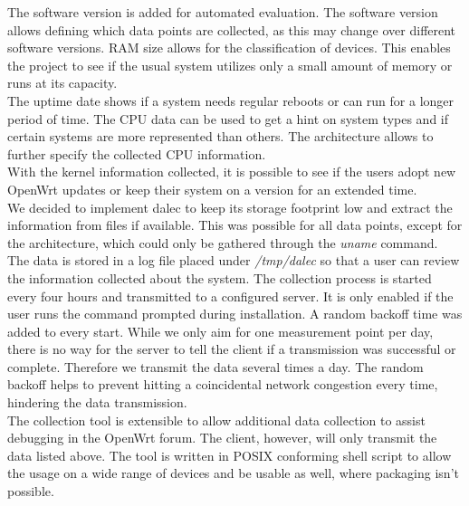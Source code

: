     The software version is added for automated evaluation. The software version allows defining which data points are collected, as this may change over different software versions. RAM size allows for the classification of devices. This enables the project to see if the usual system utilizes only a small amount of memory or runs at its capacity.\\
    The uptime date shows if a system needs regular reboots or can run for a longer period of time. The CPU data can be used to get a hint on system types and if certain systems are more represented than others. The architecture allows to further specify the collected CPU information.\\
    With the kernel information collected, it is possible to see if the users adopt new OpenWrt updates or keep their system on a version for an extended time.\\
    
    We decided to implement dalec to keep its storage footprint low and extract the information from files if available. This was possible for all data points, except for the architecture, which could only be gathered through the \textit{uname} command. The data is stored in a log file placed under \textit{/tmp/dalec} so that a user can review the information collected about the system. The collection process is started every four hours and transmitted to a configured server. It is only enabled if the user runs the command prompted during installation. A random backoff time was added to every start. While we only aim for one measurement point per day, there is no way for the server to tell the client if a transmission was successful or complete. Therefore we transmit the data several times a day. The random backoff helps to prevent hitting a coincidental network congestion every time, hindering the data transmission.\\
    The collection tool is extensible to allow additional data collection to assist debugging in the OpenWrt forum. The client, however, will only transmit the data listed above. The tool is written in POSIX conforming shell script to allow the usage on a wide range of devices and be usable as well, where packaging isn't possible.
%
